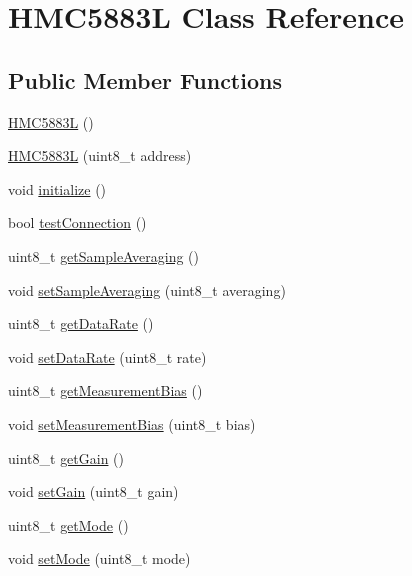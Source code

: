 \hypertarget{class_h_m_c5883_l}{}\section{H\+M\+C5883\+L Class Reference}
\label{class_h_m_c5883_l}
\subsection*{Public Member Functions}
\begin{DoxyCompactItemize}
\item 
\hyperlink{class_h_m_c5883_l_ab552ed5dd985c500aa37ac11f9ed3eed}{H\+M\+C5883\+L} ()
\item 
\hyperlink{class_h_m_c5883_l_ad7dd693f11a1486efb3ecd7d3d5158b6}{H\+M\+C5883\+L} (uint8\+\_\+t address)
\item 
void \hyperlink{class_h_m_c5883_l_a6e895366c47f22ab9dbe2750f2302dc4}{initialize} ()
\item 
bool \hyperlink{class_h_m_c5883_l_acfa47db9eccdf7ac120935de8a123f33}{test\+Connection} ()
\item 
uint8\+\_\+t \hyperlink{class_h_m_c5883_l_a99c7262f906b7bd4b0deb4e94857dfd9}{get\+Sample\+Averaging} ()
\item 
void \hyperlink{class_h_m_c5883_l_a9bf281a4dcf8f21f9a64624f835b8974}{set\+Sample\+Averaging} (uint8\+\_\+t averaging)
\item 
uint8\+\_\+t \hyperlink{class_h_m_c5883_l_aabc0bc9aca80ba60edb73a3a79a3591a}{get\+Data\+Rate} ()
\item 
void \hyperlink{class_h_m_c5883_l_a2a13729786821e826448fac7ee43ad9e}{set\+Data\+Rate} (uint8\+\_\+t rate)
\item 
uint8\+\_\+t \hyperlink{class_h_m_c5883_l_a7210ef51ef0ad1d0908204ef5b720cac}{get\+Measurement\+Bias} ()
\item 
void \hyperlink{class_h_m_c5883_l_aafc17d11bb9f4ed9660ac0fd94991aa8}{set\+Measurement\+Bias} (uint8\+\_\+t bias)
\item 
uint8\+\_\+t \hyperlink{class_h_m_c5883_l_aafb840245d6da7e4b99d0fd60517449e}{get\+Gain} ()
\item 
void \hyperlink{class_h_m_c5883_l_a1b1afb0da7ce46bede77773c99223d43}{set\+Gain} (uint8\+\_\+t gain)
\item 
uint8\+\_\+t \hyperlink{class_h_m_c5883_l_a3bc31a9c1d3db84f608da8a78b65b86f}{get\+Mode} ()
\item 
void \hyperlink{class_h_m_c5883_l_a2838d4abd590beecad8946c4b97b7f24}{set\+Mode} (uint8\+\_\+t mode)

\end{DoxyCompactItemize}
